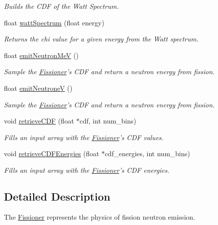 \begin{DoxyCompactItemize}
\begin{DoxyCompactList}\small\item\em Builds the C\-D\-F of the Watt Spectrum. \end{DoxyCompactList}\item 
float \hyperlink{classFissioner_a0d7eec9e2367c433a3dff894b86066af}{watt\-Spectrum} (float energy)
\begin{DoxyCompactList}\small\item\em Returns the chi value for a given energy from the Watt spectrum. \end{DoxyCompactList}\item 
float \hyperlink{classFissioner_a7d4ead1d590eecfc19e7a57361f1c4d7}{emit\-Neutron\-Me\-V} ()
\begin{DoxyCompactList}\small\item\em Sample the \hyperlink{classFissioner}{Fissioner}'s C\-D\-F and return a neutron energy from fission. \end{DoxyCompactList}\item 
float \hyperlink{classFissioner_ab60b9ea50cf7d8b1b1a2b7e5a134ee55}{emit\-Neutrone\-V} ()
\begin{DoxyCompactList}\small\item\em Sample the \hyperlink{classFissioner}{Fissioner}'s C\-D\-F and return a neutron energy from fission. \end{DoxyCompactList}\item 
void \hyperlink{classFissioner_a6df11ab0fc579364199a88e72d60f666}{retrieve\-C\-D\-F} (float $\ast$cdf, int num\-\_\-bins)
\begin{DoxyCompactList}\small\item\em Fills an input array with the \hyperlink{classFissioner}{Fissioner}'s C\-D\-F values. \end{DoxyCompactList}\item 
void \hyperlink{classFissioner_a62bbe8c05eea905ec6aef328bbab8da8}{retrieve\-C\-D\-F\-Energies} (float $\ast$cdf\-\_\-energies, int num\-\_\-bins)
\begin{DoxyCompactList}\small\item\em Fills an input array with the \hyperlink{classFissioner}{Fissioner}'s C\-D\-F energies. \end{DoxyCompactList}\end{DoxyCompactItemize}


\subsection{Detailed Description}
The \hyperlink{classFissioner}{Fissioner} represents the physics of fission neutron emission. 


